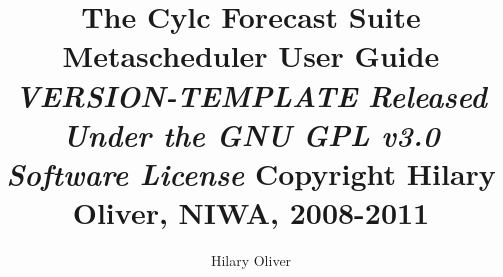 \documentclass[11pt,a4paper,titlepage]{article}
\title{The Cylc Forecast Suite Metascheduler\linebreak 
User Guide \linebreak 
{\em \small VERSION-TEMPLATE} \linebreak
{\em \small Released Under the GNU GPL v3.0 Software License} \linebreak
{\small Copyright Hilary Oliver, NIWA, 2008-2011}}
\author{Hilary Oliver}
\begin{document}
\maketitle

\pagebreak



\pagebreak
\tableofcontents
\listoffigures

\pagebreak

\end{document}
